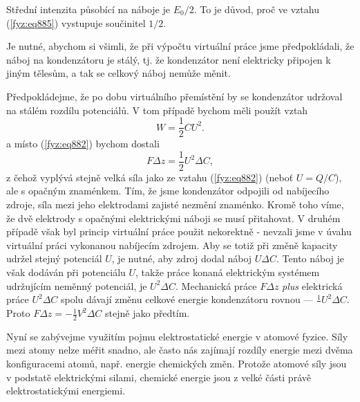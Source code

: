     Střední intenzita působící na náboje je \(E_0/2\). To je důvod, proč ve vztahu (\ref{fyz:eq885})
    vystupuje součinitel \(1/2\).

    Je nutné, abychom si všimli, že při výpočtu virtuální práce jsme předpokládali, že náboj na
    kondenzátoru je stálý, tj. že kondenzátor není elektricky připojen k jiným tělesům, a tak se
    celkový náboj nemůže měnit. 
    
    Předpokládejme, že po dobu virtuálního přemístění by se kondenzátor udržoval na stálém rozdílu
    potenciálů. V tom případě bychom měli použít vztah
    \begin{equation*}
      W = \dfrac{1}{2}CU^2.
    \end{equation*}
    a místo (\ref{fyz:eq882}) bychom dostali
    \begin{equation*}
      FΔz=\dfrac{1}{2}U^2ΔC,
    \end{equation*}
    z čehož vyplývá stejně velká síla jako ze vztahu (\ref{fyz:eq882}) (neboť \(U= Q/C\)), ale s
    opačným znaménkem. Tím, že jsme kondenzátor odpojili od nabíjecího zdroje, síla mezi jeho
    elektrodami zajisté nezmění znaménko. Kromě toho víme, že dvě elektrody s opačnými elektrickými
    náboji se musí přitahovat. V druhém případě však byl princip virtuální práce použit nekorektně -
    nevzali jsme v úvahu virtuální práci vykonanou nabíjecím zdrojem. Aby se totiž při změně
    kapacity udržel stejný potenciál \(U\), je nutné, aby zdroj dodal náboj \(U\Delta C\). Tento
    náboj je však dodáván při potenciálu \(U\), takže práce konaná elektrickým systémem udržujícím
    neměnný potenciál, je \(U^2\Delta C\). Mechanická práce \(F\Delta z\) \emph{plus} elektrická
    práce \(U^2\Delta C\) spolu dávají změnu celkové energie kondenzátoru rovnou —
    \(\frac{1}{}U^2\Delta C\). Proto \(FΔz=−\frac{1}{2}V^2ΔC\) stejně jako předtím.
    
  
    Nyní se zabývejme využitím pojmu elektrostatické energie v atomové fyzice. Síly mezi atomy nelze
    méřit snadno, ale často nás zajímají rozdíly energie mezi dvěma konfiguracemi atomů, např.
    energie chemických změn. Protože atomové síly jsou v podstatě elektrickými silami, chemické
    energie jsou z velké části právě elektrostatickými energiemi.
    
